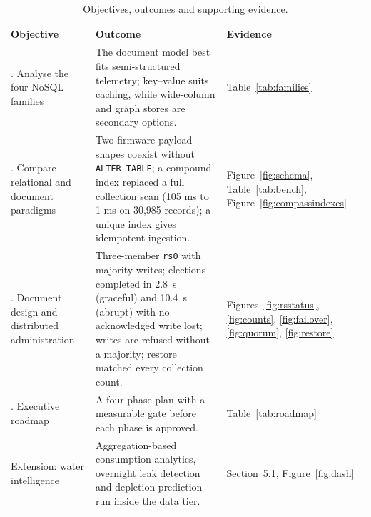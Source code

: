 \documentclass[11pt,a4paper]{article}
\begin{document}
\begin{table}[htbp]
\centering\small
\caption{Objectives, outcomes and supporting evidence.}\label{tab:objectives}
\renewcommand{\arraystretch}{1.3}
\begin{tabularx}{\textwidth}{|>{\raggedright\arraybackslash}p{3.1cm}|Y|>{\raggedright\arraybackslash}p{3.4cm}|}
\hline
\textbf{Objective} & \textbf{Outcome} & \textbf{Evidence}\\
. Analyse the four NoSQL families & The document model best fits semi-structured telemetry; key--value suits caching, while wide-column and graph stores are secondary options. & Table~\ref{tab:families}\\
. Compare relational and document paradigms & Two firmware payload shapes coexist without \texttt{ALTER TABLE}; a compound index replaced a full collection scan (105 ms to 1 ms on 30,985 records); a unique index gives idempotent ingestion. & Figure~\ref{fig:schema}, Table~\ref{tab:bench}, Figure~\ref{fig:compassindexes}\\
. Document design and distributed administration & Three-member \texttt{rs0} with majority writes; elections completed in 2.8~s (graceful) and 10.4~s (abrupt) with no acknowledged write lost; writes are refused without a majority; restore matched every collection count. & Figures~\ref{fig:rsstatus}, \ref{fig:counts}, \ref{fig:failover}, \ref{fig:quorum}, \ref{fig:restore}\\
. Executive roadmap & A four-phase plan with a measurable gate before each phase is approved. & Table~\ref{tab:roadmap}\\
\hline
Extension: water intelligence & Aggregation-based consumption analytics, overnight leak detection and depletion prediction run inside the data tier. & Section~5.1, Figure~\ref{fig:dash}\\
\hline
\end{tabularx}
\end{table}
\end{document}

